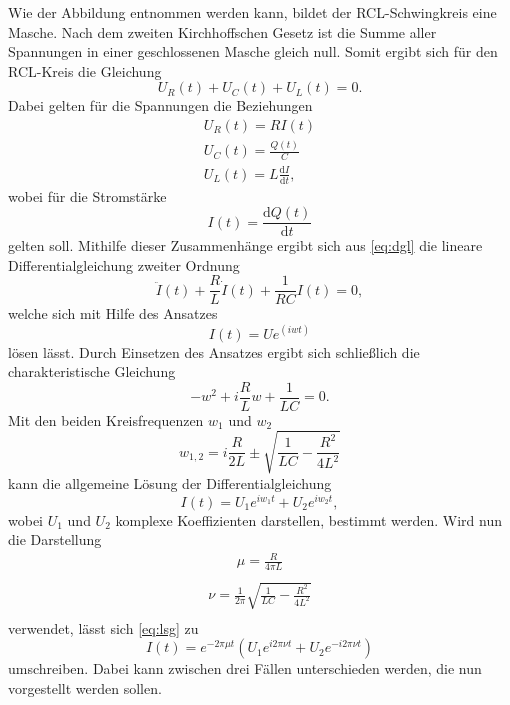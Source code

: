 Wie der Abbildung  entnommen werden kann, bildet der RCL-Schwingkreis eine Masche. Nach
dem zweiten Kirchhoffschen Gesetz ist die Summe aller Spannungen in einer geschlossenen Masche 
gleich null. Somit ergibt sich für den RCL-Kreis die Gleichung
\begin{equation}
    U_R(t)+U_C(t)+U_L(t) = 0.
    \label{eq:dgl}
\end{equation}
Dabei gelten für die Spannungen die Beziehungen
\begin{align*}
    U_R(t) = R I(t) \\ 
    U_C(t) = \frac{Q(t)}{C} \\ 
    U_L(t) = L \frac{\mathrm{d}I}{\mathrm{d}t},
\end{align*}
\noindent
wobei für die Stromstärke 
\begin{equation}
    I(t) = \frac{\mathrm{d}Q(t)}{\mathrm{d}t}
\end{equation}
\noindent
gelten soll. Mithilfe dieser Zusammenhänge ergibt sich aus \ref{eq:dgl} die lineare 
Differentialgleichung zweiter Ordnung
\begin{equation}
    \ddot{I}(t) + \frac{R}{L}\dot{I}(t) + \frac{1}{RC}I(t) = 0,
\end{equation}
\noindent
welche sich mit Hilfe des Ansatzes
\begin{equation}
    I(t) = U e^(iwt)
\end{equation}
\noindent 
lösen lässt. Durch Einsetzen des Ansatzes ergibt sich schließlich die charakteristische Gleichung
\begin{equation}
    -w^2 + i\frac{R}{L}w+\frac{1}{LC} = 0.
\end{equation}
\noindent
Mit den beiden Kreisfrequenzen $w_1$ und $w_2$ 
\begin{equation}
    w_{1,2} = i \frac{R}{2L} \pm \sqrt{\frac{1}{LC}-\frac{R^{2}}{4L^{2}}}
\end{equation}
\noindent
kann die allgemeine Lösung der Differentialgleichung 
\begin{equation}
    I(t) = U_1 e^{i w_1 t} + U_2 e^{i w_2 t},
    \label{eq:lsg}
\end{equation}
\noindent
wobei $U_1$ und $U_2$ komplexe Koeffizienten darstellen, bestimmt werden. Wird nun die 
Darstellung
\begin{align}
    \mu = \frac{R}{4\pi L} \nonumber \\
\end{align}
\noindent
\begin{align}
    \nu = \frac{1}{2\pi} \sqrt{\frac{1}{LC}-\frac{R^{2}}{4L^{2}}} \nonumber \\
\end{align}
\noindent
verwendet, lässt sich \ref{eq:lsg} zu
\begin{equation}
    I(t) = e^{-2\pi \mu t} \left( U_1 e^{i 2 \pi \nu t} + U_2 e^{-i 2 \pi \nu t} \right)
    \label{eq:Stromstaerke}
\end{equation}
\noindent
umschreiben. Dabei kann zwischen drei Fällen unterschieden werden, die nun vorgestellt 
werden sollen.








